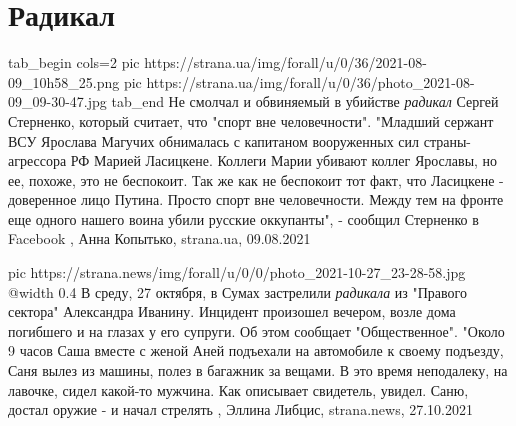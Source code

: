  
 
 
 
 
\chapter{Радикал}
\label{sec:slova.radikal}

\ifcmt
  tab_begin cols=2
     pic https://strana.ua/img/forall/u/0/36/2021-08-09_10h58_25.png
     pic https://strana.ua/img/forall/u/0/36/photo_2021-08-09_09-30-47.jpg
  tab_end
\fi
Не смолчал и обвиняемый в убийстве \emph{радикал} Сергей Стерненко, который считает,
что "спорт вне человечности".  "Младший сержант ВСУ Ярослава Магучих обнималась
с капитаном вооруженных сил страны-агрессора РФ Марией Ласицкене.  Коллеги
Марии убивают коллег Ярославы, но ее, похоже, это не беспокоит.  Так же как не
беспокоит тот факт, что Ласицкене - доверенное лицо Путина.  Просто спорт вне
человечности.  Между тем на фронте еще одного нашего воина убили русские
оккупанты", - сообщил Стерненко в Facebook
, 
Анна Копытько, strana.ua, 09.08.2021

\ifcmt
  pic https://strana.news/img/forall/u/0/0/photo_2021-10-27_23-28-58.jpg
  @width 0.4
\fi
В среду, 27 октября, в Сумах застрелили \emph{радикала} из "Правого сектора"
Александра Иванину. Инцидент произошел вечером, возле дома погибшего и на
глазах у его супруги.  Об этом сообщает "Общественное".  "Около 9 часов Саша
вместе с женой Аней подъехали на автомобиле к своему подъезду, Саня вылез из
машины, полез в багажник за вещами. В это время неподалеку, на лавочке, сидел
какой-то мужчина. Как описывает свидетель, увидел. Саню, достал оружие - и
начал стрелять
, 
Эллина Либцис, strana.news, 27.10.2021

